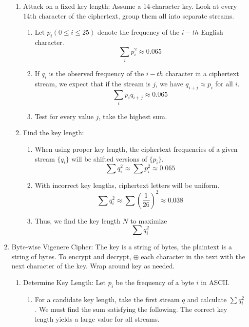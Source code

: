 \documentclass[12pt,letterpaper]{article}
\begin{document}
\begin{enumerate}
\begin{enumerate}
                \item Attack on a fixed key length: Assume a 14-character key. Look at every 14th character of the ciphertext, group them all into separate streams.
                    \begin{enumerate}
                        \item Let $p_i(0\leq i\leq 25)$ denote the frequency of the $i-th$ English character.
                            \[\sum_i p_i^2\approx 0.065\]
                        \item If $q_i$ is the observed frequency of the $i-th$ character in a ciphertext stream, we expect that if the stream is $j$, we have $q_{i+j}\approx p_i$ for all $i$.
                            \[\sum_i p_iq_{i+j}\approx 0.065\]
                        \item Test for every value $j$, take the highest sum.
                    \end{enumerate}
                \item Find the key length: 
                    \begin{enumerate}
                        \item When using proper key length, the ciphertext frequencies of a given stream $\{q_i\}$ will be shifted versions of $\{p_i\}$.
                        \[\sum q_i^2\approx\sum p_i^2\approx 0.065\]
                    \item With incorrect key lengths, ciphertext letters will be uniform.
                        \[\sum q_i^2\approx \sum\left(\frac{1}{26}\right)^2\approx0.038\]
                    \item  Thus, we find the key length $N$ to maximize 
                        \[\sum q_i^2\]
                    \end{enumerate}
            \end{enumerate}\newpage
            \item Byte-wise Vigenere Cipher: The key is a string of bytes, the plaintext is a string of bytes. To encrypt and decrypt, $\oplus$ each character in the text with the next character of the key. Wrap around key as needed.
        \begin{enumerate}
            \item Determine Key Length: Let $p_i$ be the frequency of a byte $i$ in ASCII.
            \begin{enumerate}
                \item For a candidate key length, take the first stream $q$ and calculate $\sum q_i^2$. We must find the sum satisfying the following. The correct key length yields a large value for all streams.

\end{enumerate}
\end{enumerate}
\end{enumerate}
\end{document}
